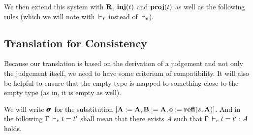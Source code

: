 \documentclass[a4paper,english]{lipics-utf8x}
\begin{document}
  We then extend this system with $\operatorname{\mathbf{R}}$, $\operatorname{\mathbf{inj}}(t)$ and $\operatorname{\mathbf{proj}}(t)$ as well as
  the following rules (which we will note with $\,\vdash_r$ instead of $\,\vdash_e$).

  \begin{mathc}
    \ru{\derr \Gamma
      }{\Gamma \derr \mR : \sB}
    \qquad
    \qquad
  \end{mathc}

  \begin{mathc}
    \qquad
  \end{mathc}

  \subsection{Translation for Consistency}

  Because our translation is based on the derivation of a judgement and not
  only the judgement itself, we need to have some criterium of compatibility.
  It will also be helpful to ensure that the empty type is mapped to something
  close to the empty type (as in, it is empty as well).

  We will write $\operatorname{\pmb{\bm{\sigma}}}$ for the substitution
  $[\operatorname{\mathbf{A}} := \operatorname{\mathbf{A}}, \operatorname{\mathbf{B}} := \operatorname{\mathbf{A}}, \operatorname{\mathbf{e}} := \operatorname{\mathbf{refl}}(s,\operatorname{\mathbf{A}})]$.
  And in the following $\Gamma \,\vdash_e t = t'$ shall mean that there exists $A$
  such that $\Gamma \,\vdash_e t = t' : A$ holds.
\end{document}
